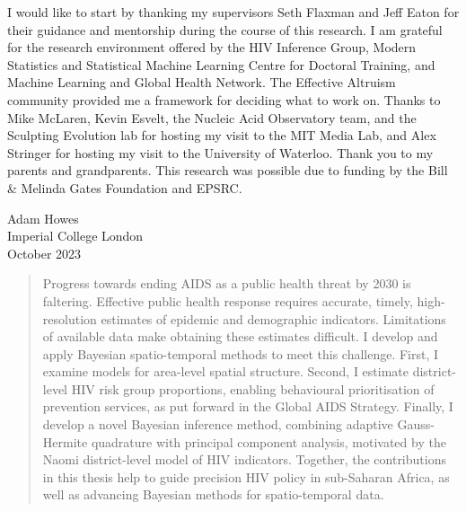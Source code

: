 \documentclass[a4paper, nobind]{templates/ociamthesis}
\begin{document}
\begin{romanpages}
\begin{acknowledgements}
 	I would like to start by thanking my supervisors Seth Flaxman and Jeff Eaton for their guidance and mentorship during the course of this research.
 I am grateful for the research environment offered by the HIV Inference Group, Modern Statistics and Statistical Machine Learning Centre for Doctoral Training, and Machine Learning and Global Health Network.
 The Effective Altruism community provided me a framework for deciding what to work on.
 Thanks to Mike McLaren, Kevin Esvelt, the Nucleic Acid Observatory team, and the Sculpting Evolution lab for hosting my visit to the MIT Media Lab, and Alex Stringer for hosting my visit to the University of Waterloo.
 Thank you to my parents and grandparents.
 This research was possible due to funding by the Bill \& Melinda Gates Foundation and EPSRC.

 \begin{flushright}
 Adam Howes \\
 Imperial College London\\
 October 2023
 \end{flushright}
\end{acknowledgements}

\begin{abstract}
	Progress towards ending AIDS as a public health threat by 2030 is faltering.
Effective public health response requires accurate, timely, high-resolution estimates of epidemic and demographic indicators.
Limitations of available data make obtaining these estimates difficult.
I develop and apply Bayesian spatio-temporal methods to meet this challenge.
First, I examine models for area-level spatial structure.
Second, I estimate district-level HIV risk group proportions, enabling behavioural prioritisation of prevention services, as put forward in the Global AIDS Strategy.
Finally, I develop a novel Bayesian inference method, combining adaptive Gauss-Hermite quadrature with principal component analysis, motivated by the Naomi district-level model of HIV indicators.
Together, the contributions in this thesis help to guide precision HIV policy in sub-Saharan Africa, as well as advancing Bayesian methods for spatio-temporal data.
\end{abstract}

  \dominitoc %


\end{romanpages}
\end{document}
